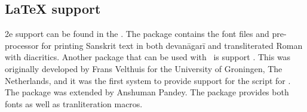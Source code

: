 \subsection{LaTeX support}

\latex2e support can be found in the . The package contains the font files and pre-processor for printing Sanskrit
text in both devanāgarī and transliterated Roman with diacritics. Another package that can be used with \XeTeX\ is support .  This was originally developed by Frans Velthuis for the University of Groningen, The Netherlands, and it was the first system to provide
support for the script for \tex. The package was  extended by Anshuman Pandey. The package provides both fonts as well as tranliteration macros.








